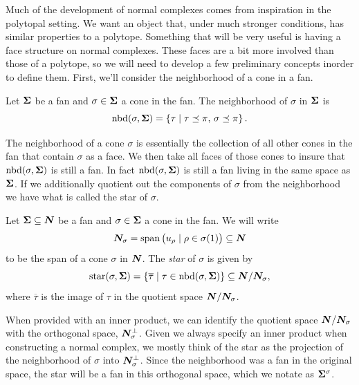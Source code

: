 \documentclass[12pt,oneside]{../../sfsuthesis}
\begin{document}
Much of the development of normal complexes comes from inspiration in the polytopal setting.
We want an object that, under much stronger conditions, has similar properties to a polytope.
Something that will be very useful is having a face structure on normal complexes.
These faces are a bit more involved than those of a polytope, so we will need to develop a few preliminary concepts inorder to define them.
First, we'll consider the neighborhood of a cone in a fan.
\begin{definition}[Neighborhood]\th\label{def:nbr}
    Let \( {\bm{\Sigma}} \) be a fan and \( \sigma \in {\bm{\Sigma}} \) a cone in the fan.
    The neighborhood of \( \sigma \) in \( {\bm{\Sigma}} \) is
    \[
        \operatorname{nbd}(\sigma, {\bm{\Sigma}}) = \left\{ \tau \; \middle| \; \tau \preceq \pi, \, \sigma \preceq \pi \right\}.
    \]
\end{definition}
The neighborhood of a cone \( \sigma \) is essentially the collection of all other cones in the fan that contain \( \sigma \) as a face.
We then take all faces of those cones to insure that \( \operatorname{nbd}(\sigma, {\bm{\Sigma}}) \) is still a fan.
In fact \( \operatorname{nbd}(\sigma, {\bm{\Sigma}}) \) is still a fan living in the same space as \( {\bm{\Sigma}} \).
If we additionally quotient out the components of \( \sigma \) from the neighborhood we have what is called the star of \( \sigma \).
\begin{definition}[Star]\th\label{def:star}
    Let \( {\bm{\Sigma}} \subseteq \bm{N} \) be a fan and \( \sigma \in {\bm{\Sigma}} \) a cone in the fan.
    We will write
    \[
        \bm{N}_\sigma = \operatorname{span}\big(u_\rho \; | \; \rho \in \sigma(1)\big) \subseteq \bm{N}
    \]
    to be the span of a cone \( \sigma \) in \( \bm{N} \).
    The \emph{star} of \( \sigma \) is given by
    \[
        \operatorname{star}(\sigma, {\bm{\Sigma}}) = \left\{ \overline{\tau} \; \middle| \; \tau \in \operatorname{nbd}(\sigma, {\bm{\Sigma}}) \right\} \subseteq \bm{N} / \bm{N}_\sigma,
    \]
    where \( \overline{\tau} \) is the image of \( \tau \) in the quotient space \( \bm{N} / \bm{N}_\sigma \).
\end{definition}
When provided with an inner product, we can identify the quotient space \( \bm{N} / \bm{N}_\sigma\) with the orthogonal space, \( \bm{N}_\sigma^\bot \).
Given we always specify an inner product when constructing a normal complex, we mostly think of the star as the projection of the neighborhood of \( \sigma \) into \( \bm{N}_\sigma^\bot \).
Since the neighborhood was a fan in the original space, the star will be a fan in this orthogonal space, which we notate as  \( {\bm{\Sigma}}^{\sigma} \).
\end{document}

